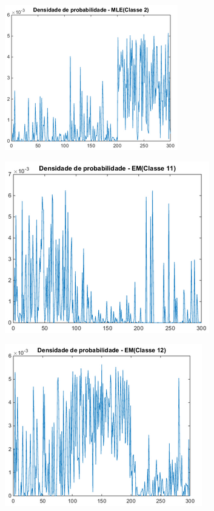 \documentclass[12pt,twoside]{report}
\begin{document}
\begin{figure}[ht]
    \centering
    \includegraphics{pdf_mle_c2}
    \caption{}
    \label{fig:pdf_mle_c2}
\end{figure}

\begin{figure}[ht]
    \centering
    \includegraphics{pdf_em_c11}
    \caption{}
    \label{fig:pdf_em_c11}
\end{figure}

\begin{figure}[ht]
    \centering
    \includegraphics{pdf_em_c12}
    \caption{}
    \label{fig:pdf_em_c12}
\end{figure}
\end{document}
